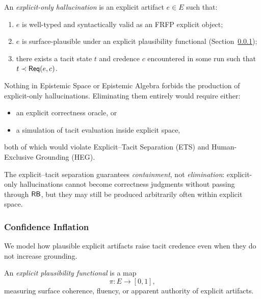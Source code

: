 \begin{definition}
An \emph{explicit-only hallucination} is an explicit artifact
\(e \in E\) such that:
\begin{enumerate}
  \item \(e\) is well-typed and syntactically valid as an FRFP explicit
        object;
  \item \(e\) is surface-plausible under an explicit plausibility
        functional (Section~\ref{sec:B7-confidence});
  \item there exists a tacit state \(t\) and credence \(c\) encountered
        in some run such that
        \(t \prec \mathsf{Req}(e,c)\).
\end{enumerate}
\end{definition}

\begin{proposition}
Nothing in Epistemic Space or Epistemic Algebra forbids the production of explicit-only
hallucinations. Eliminating them entirely would require either:
\begin{itemize}
  \item an explicit correctness oracle, or
  \item a simulation of tacit evaluation inside explicit space,
\end{itemize}
both of which would violate Explicit--Tacit Separation (ETS) and
Human-Exclusive Grounding (HEG).

The explicit--tacit separation guarantees \emph{containment}, not
\emph{elimination}: explicit-only hallucinations cannot become
correctness judgments without passing through \(\mathsf{RB}\), but they may
still be produced arbitrarily often within explicit space.
\end{proposition}

\subsubsection{Confidence Inflation}
\label{sec:B7-confidence}

We model how plausible explicit artifacts raise tacit credence even
when they do not increase grounding.

\begin{definition}
An \emph{explicit plausibility functional} is a map
\[
\pi : E \to [0,1],
\]
measuring surface coherence, fluency, or apparent authority of explicit
artifacts.
\end{definition}


